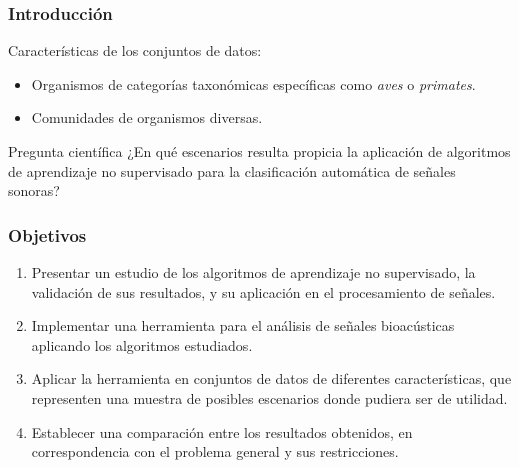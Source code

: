 \begin{frame}
    \frametitle{Introducción}

    Características de los conjuntos de datos:
    \begin{itemize}
        \item Organismos de categorías taxonómicas específicas como \textit{aves} o \textit{primates}.
        \item Comunidades de organismos diversas.
    \end{itemize}

    \begin{block}{Pregunta científica}
        ¿En qué escenarios resulta propicia la aplicación de algoritmos de aprendizaje no supervisado para la clasificación automática de señales sonoras?
    \end{block}
\end{frame}

\begin{frame}
    \frametitle{Objetivos}

    \begin{enumerate}
        \item<1-> Presentar un estudio de los algoritmos de aprendizaje no supervisado, la validación de sus resultados, y su aplicación en el procesamiento de señales.
        \item<2-> Implementar una herramienta para el análisis de señales bioacústicas aplicando los algoritmos estudiados.
        \item<3-> Aplicar la herramienta en conjuntos de datos de diferentes características, que representen una muestra de posibles escenarios donde pudiera ser de utilidad.
        \item<4-> Establecer una comparación entre los resultados obtenidos, en correspondencia con el problema general y sus restricciones.
    \end{enumerate}
\end{frame}